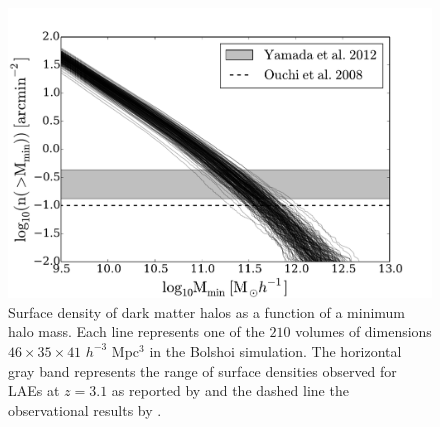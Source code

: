 \documentclass{emulateapj}
\begin{document}
\begin{figure}
\begin{center}
\includegraphics[width=0.95\linewidth,angle=0]{Fig1.pdf}
\caption{ \label{fig:halos} Surface density of dark 
  matter halos as a function of a minimum halo mass. Each line
  represents one of the $210$ volumes of dimensions $46\times 35\times
  41$ $h^{-3}$ Mpc$^{3}$ in the Bolshoi simulation. The horizontal
  gray band represents the range of surface densities observed for
  LAEs at $z=3.1$ as reported by \citet{Yamada2012} and the dashed
  line the observational results by \citet{Ouchi2008}.}
\end{center} 
\end{figure}
\end{document}
